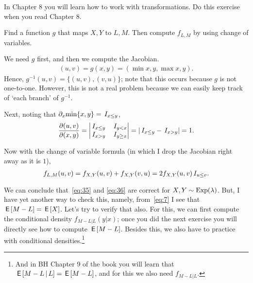 \documentclass[a4paper,12pt]{article}
\begin{document}
In Chapter 8 you will learn  how to work with transformations. Do this exercise when you read Chapter 8.
\begin{exercise}
Find a function $g$ that maps $X,Y$ to $L,M$. Then compute $f_{L,M}$ by using change of variables. 
\begin{solution}
We need $g$ first, and then we compute the Jacobian. 
\begin{align}
(u,v) = g(x, y) = (\min{x,y}, \max{x,y}).
\end{align}
Hence, $g^{-1}(u,v) = \{(u,v), (v, u)\}$; note that this occurs because $g$ is not one-to-one.
However, this is not a real problem because we can easily keep track of `each branch' of $g^{-1}$. 

Next, noting that $\partial_{x}\mathrm{min}\{x,y\} = \,I_{x\leq y}$, 
\begin{align}
\frac{\partial (u,v)}{\partial(x,y)} = 
  \begin{vmatrix}
    \,I_{x\leq y} & \,I_{y<x} \\
    \,I_{x > y} & \,I_{y \geq x} \\
  \end{vmatrix} = |\,I_{x\leq y} - \,I_{x>y}| = 1.
\end{align}

Now with the change of variable formula (in which I drop the Jacobian right away as it is $1$), 
\begin{align}
  \label{eq:30}
f_{L,M}(u,v) = f_{X,Y}(u,v) + f_{X,Y}(v,u)= 2f_{X,Y}(u,v)\,I_{u\leq v}.
\end{align}
\end{solution}
\end{exercise}

We can conclude that~\cref{eq:35} and \cref{eq:36} are correct for $X,Y\sim\mathrm{Exp}(\lambda)$.
But, I have yet another way to check this, namely, from~\cref{eq:7} I see that $\,\mathsf{E}\left[M-L\right] = \,\mathsf{E}\left[X\right]$.
Let's try to verify that also.
For this, we can first compute the conditional density $f_{M-L| L}(y| x)$; once you did the next exercise you will directly see how to compute $\,\mathsf{E}\left[M-L\right]$.
Besides this, we also have to practice with conditional densities.\footnote{And in BH Chapter 9 of the book you will learn that $\,\mathsf{E}\left[M-L\,\middle|\, L\right] = \,\mathsf{E}\left[M-L\right]$, and for this we also need $f_{M-L|L}$.}
\end{document}

